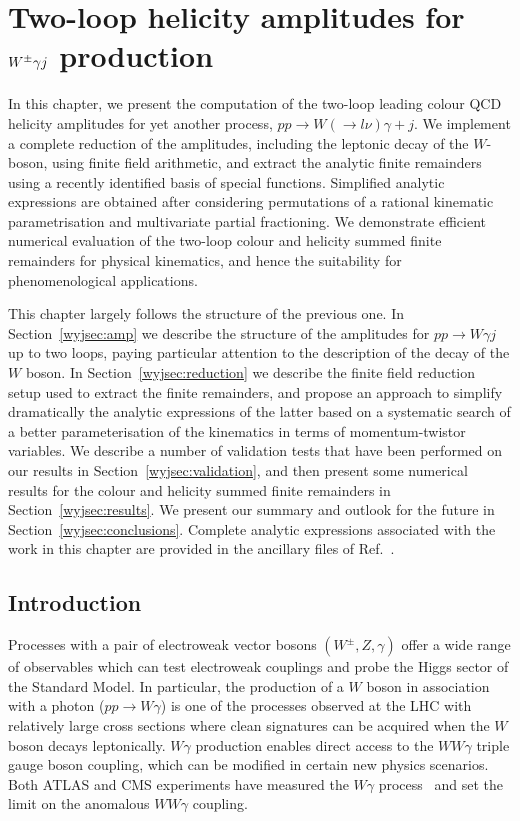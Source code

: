 \documentclass[main.tex]{subfiles}
\begin{document}
\chapter{Two-loop helicity amplitudes for $W^\pm \gamma j$ production} \label{sec:Wyj}
In this chapter, we present the computation of the two-loop leading colour QCD helicity amplitudes for yet another process, $pp\to W(\to l\nu)\gamma+j$. We implement a complete reduction of the amplitudes, including the leptonic decay of the $W$-boson,
using finite field arithmetic, and extract the analytic finite remainders using a recently
identified basis of special functions. Simplified analytic expressions are obtained after considering
permutations of a rational kinematic parametrisation and multivariate partial fractioning. We
demonstrate efficient numerical evaluation of the two-loop colour and helicity summed finite
remainders for physical kinematics, and hence the suitability for phenomenological applications.

This chapter largely follows the structure of the previous one. In Section~\ref{wyjsec:amp} we describe the structure of the
amplitudes for $pp\to W\gamma j$ up to two loops, paying particular attention to the description of
the decay of the $W$ boson. In Section~\ref{wyjsec:reduction} we describe the finite field reduction
setup used to extract the finite remainders, and propose an approach to simplify dramatically the analytic expressions of the latter based on a systematic search of a better parameterisation of the kinematics in terms of momentum-twistor variables. We describe a number of validation tests that have been
performed on our results in Section~\ref{wyjsec:validation}, and then present some numerical results for the
colour and helicity summed finite remainders in Section~\ref{wyjsec:results}. We
present our summary and outlook for the future in Section~\ref{wyjsec:conclusions}. Complete analytic expressions associated with the work in this chapter are provided in the ancillary files of Ref.~\cite{Badger:2022ncb}.

\section{Introduction \label{wyjsec:intro}}
Processes with a pair of electroweak vector bosons $(W^\pm,Z,\gamma)$ offer a wide
range of observables which can test electroweak couplings and probe the Higgs sector of the Standard
Model. In particular, the production of a $W$ boson in association with a photon ($pp\to W\gamma$) is
one of the processes observed at the LHC with relatively large cross sections where clean
signatures can be acquired when the $W$ boson decays leptonically. $W\gamma$ production enables direct access to
the $WW\gamma$ triple gauge boson coupling, which can be modified in certain new physics scenarios.
Both ATLAS and CMS experiments have measured the $W\gamma$ process~\cite{CMS:2011myh,ATLAS:2011nmx,ATLAS:2012bpb,ATLAS:2013way,CMS:2013ryd,CMS:2021foa} and set the limit on the
anomalous $WW\gamma$ coupling.
\end{document}
